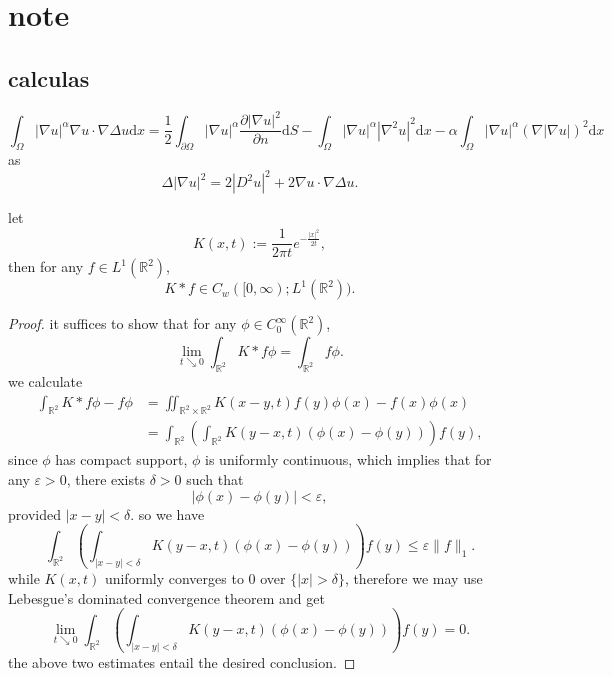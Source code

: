 
\chapter{note}
\section{calculas}
\begin{equation}
	\int_\Omega |\nabla u|^\alpha \nabla u \cdot \nabla\Delta u\mathrm{d}x = \frac{1}{2}\int_{\partial \Omega} |\nabla u|^\alpha \frac{\partial |\nabla u|^2}{\partial n}\mathrm{d}S - \int_\Omega |\nabla u|^\alpha |\nabla^2u|^2\mathrm{d}x - \alpha \int_\Omega |\nabla u|^\alpha (\nabla |\nabla u|)^2\mathrm{d}x
\end{equation}
as \begin{equation}
	\nonumber
	\Delta|\nabla u|^2 = 2|D^2u|^2 + 2\nabla u \cdot \nabla \Delta u.
\end{equation}

\begin{proposition}
	let 
	\[
		K(x,t) := \frac{1}{2\pi t}e^{-\frac{|x|^2}{2t}},
	\]
	then for any $f\in L^1(\mathbb{R}^2)$,
	\[
		K*f\in C_w([0,\infty);L^1(\mathbb{R}^2)).
	\]
\end{proposition}
\begin{proof}
	it suffices to show that for any $\phi\in C_0^\infty(\mathbb{R}^2)$,
	\[
		\lim_{t\searrow0}\int_{\mathbb{R}^2}K*f\phi = \int_{\mathbb{R}^2}f\phi.
	\]
	we calculate 
	\begin{align*}
		\int_{\mathbb{R}^2}K*f\phi - f\phi
		&= \iint_{\mathbb{R}^2\times\mathbb{R}^2}K(x-y,t)f(y)\phi(x) - f(x)\phi(x)\\
		&= \int_{\mathbb{R}^2}\left(\int_{\mathbb{R}^2}K(y-x,t)(\phi(x)-\phi(y))\right)f(y),
	\end{align*}
	since $\phi$ has compact support, $\phi$ is uniformly continuous, which implies that
	for any $\varepsilon>0$, there exists $\delta>0$ such that 
	\[
		|\phi(x)-\phi(y)|<\varepsilon,
	\]
	provided $|x-y| < \delta$.
	so we have 
	\[
		\int_{\mathbb{R}^2}\left(\int_{|x-y|<\delta}K(y-x,t)(\phi(x)-\phi(y))\right)f(y)\leq \varepsilon \|f\|_1.
	\]
	while $K(x,t)$ uniformly converges to $0$ over $\{|x|>\delta\}$, therefore
	we may use Lebesgue's dominated convergence theorem and get
	\[
		\lim_{t\searrow0} \int_{\mathbb{R}^2}\left(\int_{|x-y|<\delta}K(y-x,t)(\phi(x)-\phi(y))\right)f(y) = 0.
	\] 
	the above two estimates entail the desired conclusion.
\end{proof}


